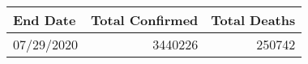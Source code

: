 \begin{tabular}{lrr}
\toprule
   End Date & Total Confirmed & Total Deaths \\
\midrule
 07/29/2020 &         3440226 &       250742 \\
\bottomrule
\end{tabular}
